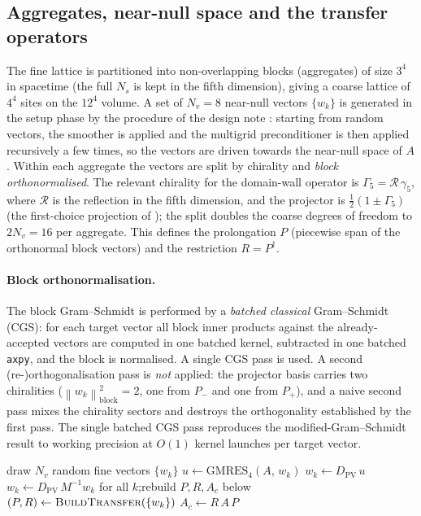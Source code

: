 \documentclass[12pt,a4paper]{article}
\newcommand{\Dpv}{D_{\mathrm{PV}}}
\newcommand{\Aop}{A}
\newcommand{\Pp}{P_{+}}
\newcommand{\Pm}{P_{-}}
\newcommand{\dg}{^{\dagger}}
\newcommand{\norm}[1]{\left\lVert #1 \right\rVert}
\begin{document}
\subsection{Aggregates, near-null space and the transfer operators}
The fine lattice is partitioned into non-overlapping blocks (aggregates) of size
$3^4$ in spacetime (the full $N_s$ is kept in the fifth dimension), giving a
coarse lattice of $4^4$ sites on the $12^4$ volume. A set of $N_v=8$ near-null
vectors $\{w_k\}$ is generated in the setup phase by the procedure of the design
note \cite{KCM2024,BridgeMG}: starting from random vectors, the smoother is
applied and the multigrid preconditioner is then applied recursively a few times,
so the vectors are driven towards the near-null space of $\Aop$. Within each
aggregate the vectors are split by chirality and \emph{block orthonormalised}. The
relevant chirality for the domain-wall operator is $\Gamma_5 = \mathcal{R}\,\gamma_5$,
where $\mathcal{R}$ is the reflection in the fifth dimension, and the projector is
$\tfrac12(1\pm\Gamma_5)$ (the first-choice projection of \cite{KCM2024}); the
split doubles the coarse degrees of freedom to $2N_v=16$ per aggregate. This
defines the prolongation $P$ (piecewise span of the orthonormal block vectors) and
the restriction $R = P\dg$.

\paragraph{Block orthonormalisation.}
The block Gram--Schmidt is performed by a \emph{batched classical} Gram--Schmidt
(CGS): for each target vector all block inner products against the
already-accepted vectors are computed in one batched kernel, subtracted in one
batched \texttt{axpy}, and the block is normalised. A single CGS pass is used. A
second (re-)orthogonalisation pass is \emph{not} applied: the projector basis
carries two chiralities ($\norm{w_k}^2_{\text{block}}=2$, one from $\Pm$ and one
from $\Pp$), and a naive second pass mixes the chirality sectors and destroys the
orthogonality established by the first pass. The single batched CGS pass
reproduces the modified-Gram--Schmidt result to working precision at $O(1)$ kernel
launches per target vector.

\begin{algorithm}[H]
\caption{Setup: near-null space and transfer operators (run once, before the solve).}
\label{alg:setup}
\begin{algorithmic}[1]
\State draw $N_v$ random fine vectors $\{w_k\}$
  \State $u \gets \mathrm{GMRES}_4(\Aop,\,w_k)$ \Comment{smoother: $u\approx\Aop^{-1}w_k$ (Alg.~\ref{alg:gmres})}
  \State $w_k \gets \Dpv\,u$ 
\EndFor
{} 
  \State $w_k \gets \Dpv\,M^{-1}w_k$ for all $k$;\quad rebuild $P,R,\Aop_c$ below
\EndFor
\State $(P,R) \gets \textsc{BuildTransfer}(\{w_k\})$ 
\State $\Aop_c \gets R\,\Aop\,P$ 
\end{algorithmic}
\end{algorithm}
\end{document}
